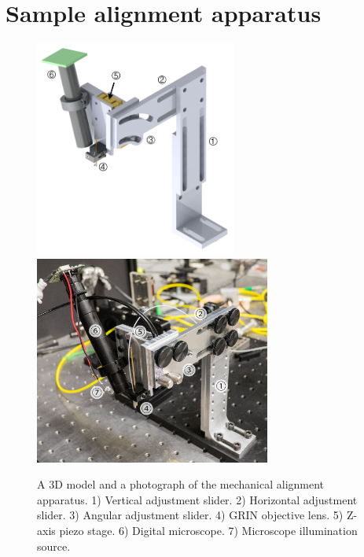 \section{Sample alignment apparatus}



\begin{figure}[h!]
\centering
\includegraphics[width=0.59\textwidth]{Images/Alignment/new_d_2_ann.png}
\\[0.8em]
\includegraphics[width=0.69\textwidth]{Images/Photographs/DSCF1696_an.jpg}
\caption[3D model and photograph of the mechanical alignment apparatus.]{A 3D model and a  photograph of the mechanical alignment apparatus. 1) Vertical adjustment slider. 2) Horizontal adjustment slider. 3) Angular adjustment slider. 4) GRIN objective lens. 5) Z-axis piezo stage. 6) Digital microscope. 7) Microscope illumination source.\label{fig:alignment_overview}}
\end{figure}


